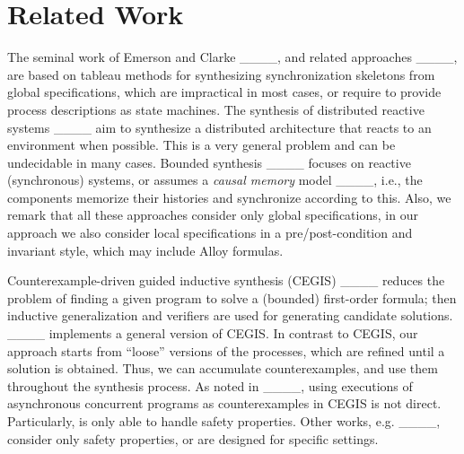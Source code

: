 \section{Related Work}
\label{sec:related}	

The seminal work of Emerson and Clarke ____, and related approaches ____, are based on tableau methods for synthesizing synchronization skeletons from global {\CTL} specifications,  which are impractical in most cases, or require to provide process descriptions as state machines.
The synthesis of distributed reactive systems ____  aim to synthesize a distributed architecture that reacts to an environment when possible. This is a very general problem and can be undecidable in many cases.  Bounded synthesis ____ focuses on reactive (synchronous) systems,
or assumes a \emph{causal memory}  model ____,  i.e.,  the components memorize their histories and synchronize according to this.  Also, we remark that all these approaches consider only global {\LTL} specifications,  in our approach we also consider local specifications in a pre/post-condition and invariant style, which may include Alloy formulas.

Counterexample-driven guided inductive synthesis (CEGIS) ____ reduces the problem of finding a given program to solve a (bounded) first-order formula; then inductive generalization and verifiers are used for generating candidate solutions. {\AlloyStar}  ____ implements a general version of CEGIS. In contrast to CEGIS, our approach starts from ``loose'' versions of the processes, which are refined until a solution is obtained. Thus, we can accumulate counterexamples, and use them throughout the synthesis process.  As noted in ____,  
using executions of asynchronous concurrent programs as counterexamples in  CEGIS is not direct.  Particularly, {\Sketch} is only able to handle safety properties.  Other works, e.g. ____, consider only safety properties, or are designed for specific settings.



